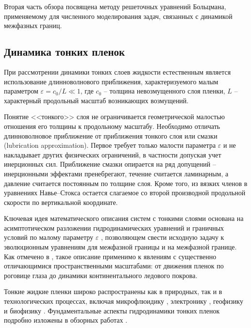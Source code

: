 \documentclass[12pt,a4paper]{article}
\begin{document}
Вторая часть обзора посвящена методу решеточных уравнений Больцмана, применяемому для численного моделирования задач, связанных с динамикой межфазных границ.


\subsection{Динамика тонких пленок}

При рассмотрении динамики тонких слоев жидкости естественным является использование длинноволнового приближения, характеризуемого малым параметром $\varepsilon = c_0  / L \ll 1$, где $c_0$ -- толщина невозмущенного слоя пленки, $L$ -- характерный продольный масштаб возникающих возмущений. 

Понятие <<тонкого>> слоя не ограничивается геометрической малостью отношения его толщины к продольному масштабу. Необходимо отличать длинноволновое приближение от приближения тонкого слоя или смазки (lubrication approximation). Первое требует только малости параметра $\varepsilon$ и не накладывает других физических ограничений, в частности допуская учет инерционных сил. Приближение смазки опирается на ряд допущений -- инерционными эффектами пренебрегают, течение считается ламинарным, а давление считается постоянным по толщине слоя. Кроме того, из вязких членов в уравнениях Навье--Стокса остается слагаемое со второй производной продольной скорости по вертикальной координате.

Ключевая идея математического описания систем с тонкими слоями основана на асимптотическом разложении гидродинамических уравнений и граничных условий по малому параметру $\varepsilon$ , позволяющем свести исходную задачу к эволюционным уравнениям для межфазной границы и на межфазной границе. Как отмечено в  \cite{Craster2009}, такое описание применимо к явлениям с существенно отличающимися пространственными масштабами: от движения пленок по роговице глаза до динамики континентального ледового покрова.

Тонкие жидкие пленки широко распространены как в природных, так и в технологических процессах, включая микрофлюидику \cite{Stone2004}, электронику \cite{Eijkel2005}, геофизику \cite{HUPPERT2006} и биофизику \cite{Grotberg1994, Sharma1986a}. Фундаментальные аспекты гидродинамики тонких пленок подробно изложены в обзорных работах \cite{Oron1997, Craster2009}. 

%	
\end{document}
